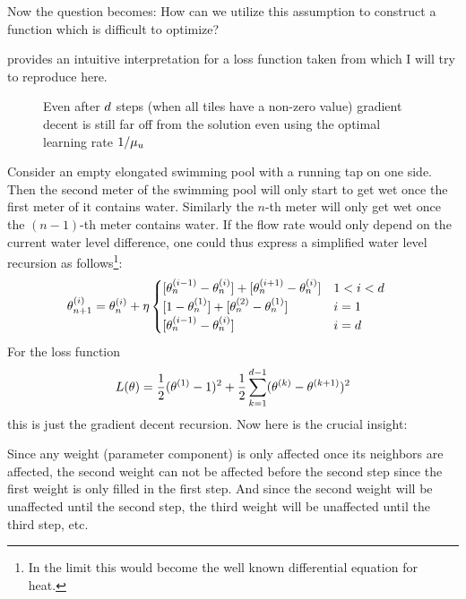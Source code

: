 Now the question becomes: How can we utilize this assumption to construct a
function which is difficult to optimize?

\textcite{gohWhyMomentumReally2017} provides an intuitive interpretation for a loss
function taken from \textcite[Section 2.1.2]{nesterovLecturesConvexOptimization2018}
which I will try to reproduce here.

\begin{figure}[h]
	\centering
	\def\svgwidth{1\textwidth}
	
	\caption{Even after \(d\) steps (when all tiles have a non-zero value)
	gradient decent is still far off from the solution even using the optimal
	learning rate \(1/\mu_u\)}
	\label{fig: visualize coloring problem}
\end{figure}
%
Consider an empty elongated swimming pool with a running tap on one side. Then
the second meter of the swimming pool will only start to get wet once the first
meter of it contains water. Similarly the \(n\)-th meter will only get wet
once the \((n-1)\)-th meter contains water. If the flow rate would only depend
on the current water level difference, one could thus express a simplified
water level recursion as follows\footnote{In the limit this would become the
well known differential equation for heat.}: 
%
\begin{align*}
	\theta_{n+1}^{(i)}
	&= \theta_{n}^{(i)}
	+ \eta 
	\begin{cases}
		[\theta_{n}^{(i-1)} - \theta_{n}^{(i)}] + [\theta_{n}^{(i+1)} - \theta_{n}^{(i)}]
		&  1 < i < d \\
		[1 - \theta_{n}^{(1)}] + [\theta_{n}^{(2)} - \theta_{n}^{(1)}]
		& i = 1 \\
		[\theta_{n}^{(i-1)} - \theta_{n}^{(i)}]
		& i = d
	\end{cases}
\end{align*}
%
For the  loss function
%
\begin{align*}
	L(\theta) = \frac12 (\theta^{(1)}-1)^2  + \frac12 \sum_{k=1}^{d-1} (\theta^{(k)}-\theta^{(k+1)})^2
\end{align*}
%
this is just the gradient decent recursion. Now here is the crucial insight:

Since any weight (parameter component) is only affected once its neighbors are
affected, the second weight can not be affected before the second step since
the first weight is only filled in the first step. And since the second weight
will be unaffected until the second step, the third weight will be unaffected
until the third step, etc.

